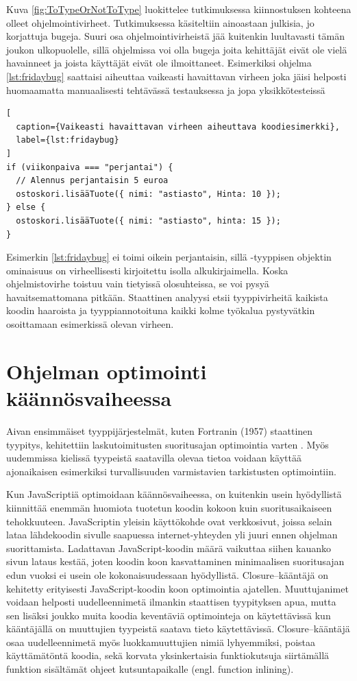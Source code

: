 Kuva \ref{fig:ToTypeOrNotToType} luokittelee
tutkimuksessa \cite{ToTypeOrNotToType} kiinnostuksen kohteena
olleet ohjelmointivirheet. Tutkimuksessa käsiteltiin ainoastaan
julkisia, jo korjattuja bugeja. Suuri osa ohjelmointivirheistä jää
kuitenkin luultavasti tämän joukon ulkopuolelle, sillä ohjelmissa voi
olla bugeja joita kehittäjät eivät ole vielä havainneet ja joista
käyttäjät eivät ole ilmoittaneet. Esimerkiksi ohjelma \ref{lst:fridaybug}
saattaisi aiheuttaa vaikeasti havaittavan virheen joka jäisi helposti 
huomaamatta manuaalisesti tehtävässä testauksessa ja jopa yksikkötesteissä
\begin{lstlisting}[
  caption={Vaikeasti havaittavan virheen aiheuttava koodiesimerkki},
  label={lst:fridaybug}
]
if (viikonpaiva === "perjantai") {
  // Alennus perjantaisin 5 euroa
  ostoskori.lisääTuote({ nimi: "astiasto", Hinta: 10 });
} else {
  ostoskori.lisääTuote({ nimi: "astiasto", hinta: 15 });
}
\end{lstlisting}
Esimerkin \ref{lst:fridaybug} ei toimi oikein perjantaisin, sillä
-tyyppisen
objektin ominaisuus  on virheellisesti kirjoitettu isolla
alkukirjaimella. Koska ohjelmistovirhe toistuu vain tietyissä olosuhteissa, se voi pysyä
havaitsemattomana pitkään. Staattinen analyysi etsii tyyppivirheitä
kaikista koodin haaroista ja tyyppiannotoituna kaikki kolme työkalua
pystyvätkin osoittamaan esimerkissä olevan virheen.

\section{Ohjelman optimointi käännösvaiheessa}
Aivan ensimmäiset tyyppijärjestelmät, kuten Fortranin (1957) staattinen tyypitys,
kehitettiin laskutoimitusten suoritusajan optimointia varten \cite{TypesAndProgrammingLanguages}.
Myös uudemmissa kielissä tyypeistä saatavilla olevaa tietoa
voidaan käyttää ajonaikaisen esimerkiksi turvallisuuden varmistavien
tarkistusten optimointiin.

Kun JavaScriptiä optimoidaan käännösvaiheessa, on kuitenkin usein hyödyllistä
kiinnittää enemmän huomiota tuotetun koodin kokoon kuin suoritusaikaiseen
tehokkuuteen. JavaScriptin yleisin käyttökohde ovat verkkosivut,
joissa selain lataa lähdekoodin sivulle saapuessa
internet-yhteyden yli juuri ennen ohjelman suorittamista. Ladattavan\newline
JavaScript-koodin määrä vaikuttaa siihen kauanko sivun lataus
kestää, joten koodin koon kasvattaminen minimaalisen suoritusajan
edun vuoksi ei usein ole kokonaisuudessaan hyödyllistä.
Closure–kääntäjä on kehitetty erityisesti
JavaScript-koodin koon optimointia ajatellen. Muuttujanimet voidaan helposti
uudelleennimetä ilmankin staattisen tyypityksen apua, mutta sen lisäksi
joukko muita koodia keventäviä optimointeja on käytettävissä kun kääntäjällä
on muuttujien tyypeistä saatava tieto käytettävissä. Closure–kääntäjä osaa
uudelleennimetä myös luokkamuuttujien nimiä lyhyemmiksi, poistaa
käyttämätöntä koodia, sekä korvata yksinkertaisia funktiokutsuja siirtämällä
funktion sisältämät ohjeet kutsuntapaikalle (engl. function inlining).


